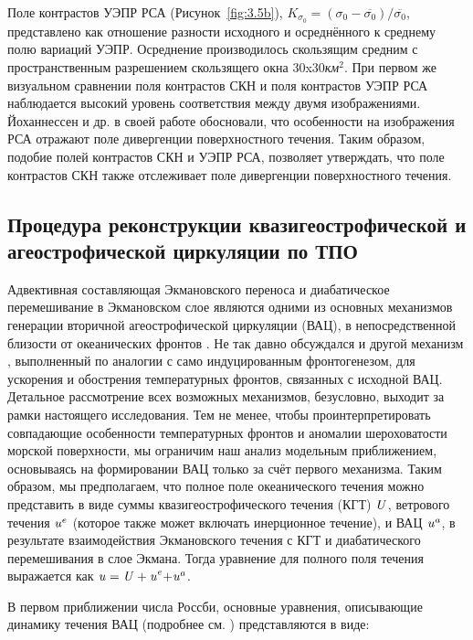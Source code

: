 {Поле контрастов УЭПР РСА (Рисунок~\ref{fig:3.5b}), $K_{\sigma _{0} } =(\sigma _{0} -\overline{\sigma _{0} })/\overline{\sigma _{0} }$, представлено как отношение разности исходного и осреднённого к среднему полю вариаций УЭПР. Осреднение производилось скользящим средним с пространственным разрешением скользящего окна 30x30\textit{км${}^2$}. При первом же визуальном сравнении поля контрастов СКН и поля контрастов УЭПР РСА наблюдается высокий уровень соответствия между двумя изображениями. Йоханнессен и др. в своей работе обосновали, что особенности на изображения РСА отражают поле дивергенции поверхностного течения. Таким образом, подобие полей контрастов СКН и УЭПР РСА, позволяет утверждать, что поле контрастов СКН также отслеживает поле дивергенции поверхностного течения.



\subsection{Процедура реконструкции квазигеострофической и агеострофической циркуляции по ТПО} \label{sec:3.2.2}


Адвективная составляющая Экмановского переноса и диабатическое перемешивание в Экмановском слое являются одними из основных механизмов генерации вторичной агеострофической циркуляции (ВАЦ), в непосредственной близости от океанических фронтов \citep{Klein1990,Garrett1981,Thompson2000,Nagai2006}. Не так давно обсуждался и другой механизм \citep{McWilliams2009}, выполненный по аналогии с само индуцированным фронтогенезом, для ускорения и обострения температурных фронтов, связанных с исходной ВАЦ. Детальное рассмотрение всех возможных механизмов, безусловно, выходит за рамки настоящего исследования. Тем не менее, чтобы проинтерпретировать совпадающие особенности температурных фронтов и аномалии шероховатости морской поверхности, мы ограничим наш анализ модельным приближением, основываясь на формировании ВАЦ только за счёт первого механизма. Таким образом, мы предполагаем, что полное поле океанического течения можно представить в виде суммы квазигеострофического течения (КГТ) ${\it U}$, ветрового течения ${\it u}^{e} $ (которое также может включать инерционное течение), и ВАЦ ${\it u}^{a} $, в результате взаимодействия Экмановского течения с КГТ и диабатического перемешивания в слое Экмана. Тогда уравнение для полного поля течения выражается как ${\it u=U+u}^{e} {\it +u}^{a} $.

В первом приближении числа Россби, основные уравнения, описывающие динамику течения ВАЦ (подробнее см. \citep{Klein1990,Garrett1981,Thompson2000,Nagai2006}) представляются в виде:



}

